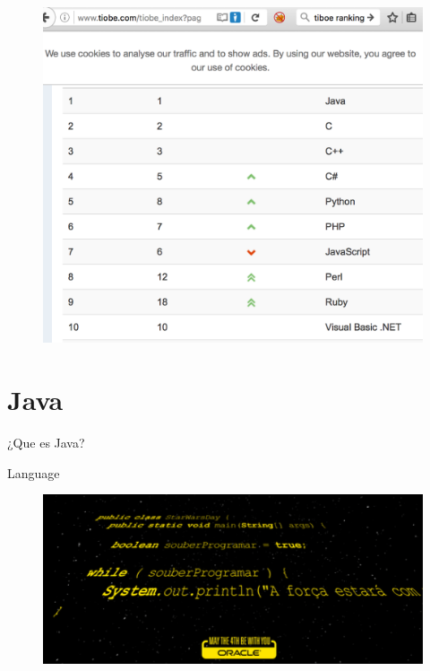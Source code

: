 \documentclass{beamer}
\begin{document}
\begin{frame}
	\begin{figure}
		\centering
		\includegraphics[width=0.9\linewidth]{Images/tiboe}
	\end{figure}
\end{frame}

\section{Java}
\begin{frame}
	\huge ¿Que es Java?
\end{frame}

\begin{frame}{Language}
	\begin{figure}
		\centering
		\includegraphics[width=0.9\linewidth]{Images/javalang}
	\end{figure}
\end{frame}
\end{document}
